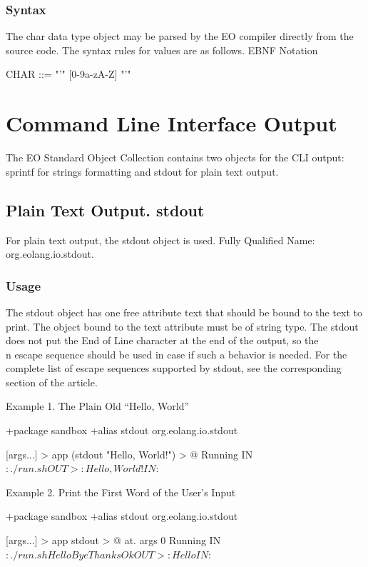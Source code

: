 \documentclass[12pt]{book}
\begin{document}
\subsubsection{Syntax}
The char data type object may be parsed by the EO compiler directly from the source code. The syntax rules for values are as follows.
EBNF Notation

\begin{ffcode}
CHAR     ::= "'" [0-9a-zA-Z] "'"
\end{ffcode}

\section{Command Line Interface Output}
The EO Standard Object Collection contains two objects for the CLI output: sprintf for strings formatting and stdout for plain text output.

\subsection{Plain Text Output. stdout}
For plain text output, the stdout object is used.
Fully Qualified Name: org.eolang.io.stdout.

\subsubsection{Usage}
The stdout object has one free attribute text that should be bound to the text to print.
The object bound to the text attribute must be of string type.
The stdout does not put the End of Line character at the end of the output, so the \\n escape sequence should be used in case if such a behavior is needed.
For the complete list of escape sequences supported by stdout, see the corresponding section of the article.

Example 1. The Plain Old “Hello, World”
\begin{ffcode}
+package sandbox
+alias stdout org.eolang.io.stdout

[args...] > app
  (stdout "Hello, World!\n") > @
Running
IN$: ./run.sh
OUT>: Hello, World!
IN$: 
\end{ffcode}

Example 2. Print the First Word of the User's Input
\begin{ffcode}
+package sandbox
+alias stdout org.eolang.io.stdout

[args...] > app
  stdout > @
    at.
      args
      0
Running
IN$: ./run.sh Hello Bye Thanks Ok
OUT>: HelloIN$: 
\end{ffcode}
\end{document}
